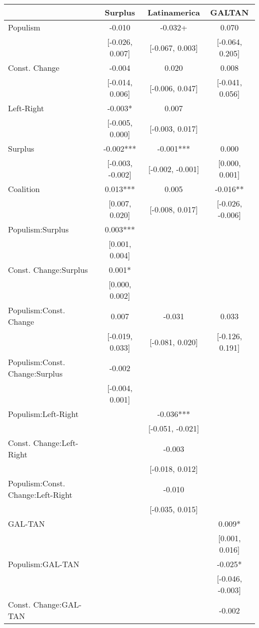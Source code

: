 \begin{table}
\centering\centering\centering
\begin{tabular}[t]{lccc}
\toprule
  & Surplus & Latinamerica & GALTAN\\
\midrule
Populism & -0.010 & -0.032+ & 0.070\\
 & {}[-0.026, 0.007] & {}[-0.067, 0.003] & {}[-0.064, 0.205]\\
Const. Change & -0.004 & 0.020 & 0.008\\
 & {}[-0.014, 0.006] & {}[-0.006, 0.047] & {}[-0.041, 0.056]\\
Left-Right & -0.003* & 0.007 & \\
 & {}[-0.005, 0.000] & {}[-0.003, 0.017] & \\
Surplus & -0.002*** & -0.001*** & 0.000\\
 & {}[-0.003, -0.002] & {}[-0.002, -0.001] & {}[0.000, 0.001]\\
Coalition & 0.013*** & 0.005 & -0.016**\\
 & {}[0.007, 0.020] & {}[-0.008, 0.017] & {}[-0.026, -0.006]\\
Populism:Surplus & 0.003*** &  & \\
 & {}[0.001, 0.004] &  & \\
Const. Change:Surplus & 0.001* &  & \\
 & {}[0.000, 0.002] &  & \\
Populism:Const. Change & 0.007 & -0.031 & 0.033\\
 & {}[-0.019, 0.033] & {}[-0.081, 0.020] & {}[-0.126, 0.191]\\
Populism:Const. Change:Surplus & -0.002 &  & \\
 & {}[-0.004, 0.001] &  & \\
Populism:Left-Right &  & -0.036*** & \\
 &  & {}[-0.051, -0.021] & \\
Const. Change:Left-Right &  & -0.003 & \\
 &  & {}[-0.018, 0.012] & \\
Populism:Const. Change:Left-Right &  & -0.010 & \\
 &  & {}[-0.035, 0.015] & \\
GAL-TAN &  &  & 0.009*\\
 &  &  & {}[0.001, 0.016]\\
Populism:GAL-TAN &  &  & -0.025*\\
 &  &  & {}[-0.046, -0.003]\\
Const. Change:GAL-TAN &  &  & -0.002\\

\end{tabular}
\end{table}
